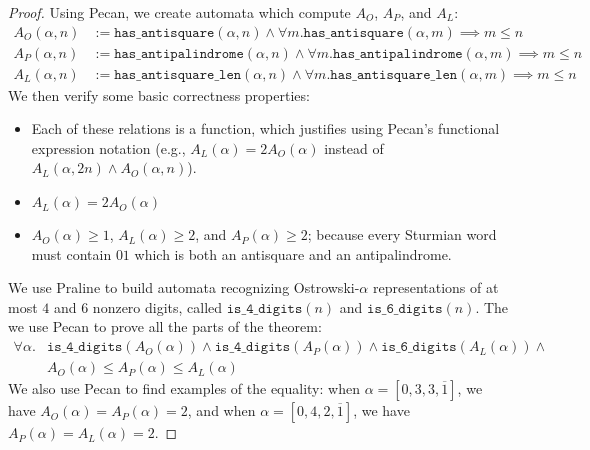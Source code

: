 \begin{proof}
    Using Pecan, we create automata which compute $A_O$, $A_P$, and $A_L$:
    \begin{align*}
        A_O(\alpha, n) &:= \texttt{has\_antisquare}(\alpha, n) \land \forall m. \texttt{has\_antisquare}(\alpha, m) \implies m \leq n \\
        A_P(\alpha, n) &:= \texttt{has\_antipalindrome}(\alpha, n) \land \forall m. \texttt{has\_antipalindrome}(\alpha, m) \implies m \leq n \\
        A_L(\alpha, n) &:= \texttt{has\_antisquare\_len}(\alpha, n) \land \forall m. \texttt{has\_antisquare\_len}(\alpha, m) \implies m \leq n
    \end{align*}
    We then verify some basic correctness properties:
    \begin{itemize}
        \item Each of these relations is a function, which justifies using Pecan's functional expression notation (e.g., $A_L(\alpha) = 2A_O(\alpha)$ instead of $A_L(\alpha, 2n) \land A_O(\alpha, n)$).
        \item $A_L(\alpha) = 2A_O(\alpha)$
        \item $A_O(\alpha) \geq 1$, $A_L(\alpha) \geq 2$, and $A_P(\alpha) \geq 2$; because every Sturmian word must contain $01$ which is both an antisquare and an antipalindrome.
    \end{itemize}
    
    We use Praline to build automata recognizing Ostrowski-$\alpha$ representations of at most $4$ and $6$ nonzero digits, called $\texttt{is\_4\_digits}(n)$ and $\texttt{is\_6\_digits}(n)$.
    The we use Pecan to prove all the parts of the theorem:
    \begin{align*}
        \forall \alpha. & \texttt{is\_4\_digits}(A_O(\alpha)) \land \texttt{is\_4\_digits}(A_P(\alpha)) \land \texttt{is\_6\_digits}(A_L(\alpha)) \land \\
                        & A_O(\alpha) \leq A_P(\alpha) \leq A_L(\alpha)
    \end{align*}
    We also use Pecan to find examples of the equality: when $\alpha = [0,3,3,\overline{1}]$, we have $A_O(\alpha) = A_P(\alpha) = 2$, and when $\alpha = [0,4,2,\overline{1}]$, we have $A_P(\alpha) = A_L(\alpha) = 2$.
    

\end{proof}
